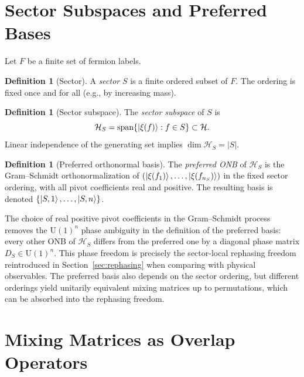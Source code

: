 \documentclass[12pt]{article}
\theoremstyle{definition}
\newtheorem{definition}[theorem]{Definition}
\theoremstyle{remark}
\newcommand{\U}{\mathrm{U}}
\newcommand{\calH}{\mathcal{H}}
\newcommand{\calHS}{\mathcal{H}_S}
\begin{document}
\section{Sector Subspaces and Preferred Bases}
\label{sec:sectors}

Let $F$ be a finite set of fermion labels.

\begin{definition}[Sector]\label{def:sector}
A \emph{sector} $S$ is a finite ordered subset of $F$.
The ordering is fixed once and for all (e.g., by increasing mass).
\end{definition}

\begin{definition}[Sector subspace]\label{def:sectorspan}
The \emph{sector subspace} of $S$ is
\[
  \calHS = \operatorname{span}\{\ket{\xi(f)}:f\in S\}\subset\calH.
\]
Linear independence of the generating set implies $\dim\calHS=|S|$.
\end{definition}

\begin{definition}[Preferred orthonormal basis]\label{def:preferred}
The \emph{preferred ONB} of $\calHS$ is the Gram--Schmidt
orthonormalization of $(\ket{\xi(f_1)},\ldots,\ket{\xi(f_{n_S})})$
in the fixed sector ordering, with all pivot coefficients real and positive.
The resulting basis is denoted $\{\ket{S,1},\ldots,\ket{S,n}\}$.
\end{definition}

The choice of real positive pivot coefficients in the Gram--Schmidt process
removes the $\U(1)^n$ phase ambiguity in the definition of the preferred
basis: every other ONB of $\calHS$ differs from the preferred one by a
diagonal phase matrix $D_S\in\U(1)^n$.
This phase freedom is precisely the sector-local rephasing freedom
reintroduced in Section~\ref{sec:rephasing} when comparing with physical
observables.
The preferred basis also depends on the sector ordering, but different
orderings yield unitarily equivalent mixing matrices up to permutations,
which can be absorbed into the rephasing freedom.

\section{Mixing Matrices as Overlap Operators}
\label{sec:mixing}
\end{document}
